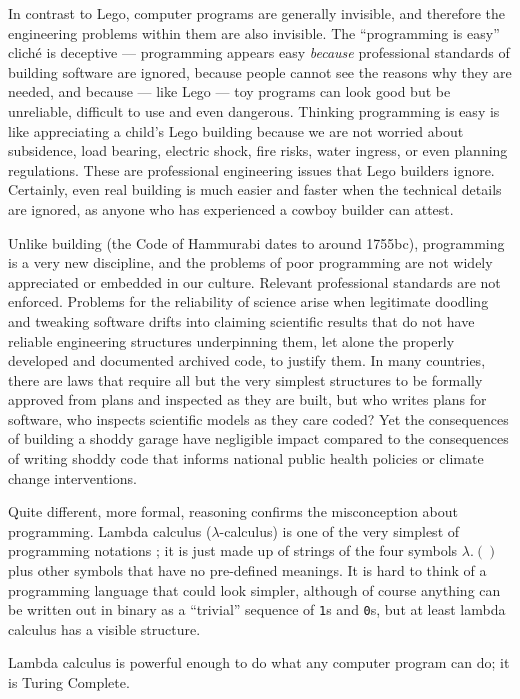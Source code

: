 \documentclass{comjnl}
\begin{document}
In contrast to Lego, computer programs are generally invisible, and therefore the engineering problems within them are also invisible. The ``programming is easy'' clich\' e is deceptive --- programming appears easy \emph{because\/} professional standards of building software are ignored, because people cannot see the reasons why they are needed, and because --- like Lego --- toy programs can look good but be unreliable, difficult to use and even dangerous. Thinking programming is easy is like appreciating a child's Lego building because we are not worried about subsidence, load bearing, electric shock, fire risks, water ingress, or even planning regulations. These are professional engineering issues that Lego builders ignore. Certainly, even real building is much easier and faster when the technical details are ignored, as anyone who has experienced a cowboy builder can attest.

Unlike building (the Code of Hammurabi dates to around 1755{\sc bc}), programming is a very new discipline, and the problems of poor programming are not widely appreciated or embedded in our culture. Relevant professional standards are not enforced. Problems for the reliability of science arise when legitimate doodling and tweaking software drifts into claiming scientific results that do not have reliable engineering structures underpinning them, let alone the properly developed and documented archived code, to justify them. In many countries, there are laws that require all but the very simplest structures to be formally approved from plans and inspected as they are built, but who writes plans for software, who inspects scientific models as they care coded? Yet the consequences of building a shoddy garage have negligible impact compared to the consequences of writing shoddy code that informs national public health policies or climate change interventions.

Quite different, more formal, reasoning confirms the misconception about programming. Lambda calculus ($\lambda$-calculus) is one of the very simplest of programming notations \cite{lambda}; it is just made up of strings of the four symbols $\lambda.()$ plus other symbols that have no pre-defined meanings. It is hard to think of a programming language that could look simpler, although of course anything can be written out in binary as a ``trivial'' sequence of \texttt{1}s and \texttt{0}s, but at least lambda calculus has a visible structure. 

Lambda calculus is powerful enough to do what any computer program can do; it is Turing Complete. 
\end{document}
